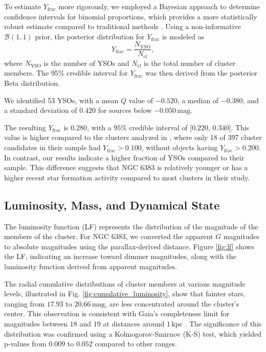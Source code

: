 \documentclass{aa}
\begin{document}
To estimate $ Y_{\text{frac}} $ more rigorously, we employed a Bayesian approach to determine confidence intervals for binomial proportions, which provides a more statistically robust estimate compared to traditional methods \citep{2011PASA...28..128C}. Using a non-informative $\mathcal{B}(1, 1)$ prior, the posterior distribution for $ Y_{\text{frac}} $ is modeled as
\begin{equation}
	Y_{\text{frac}} = \frac{N_{\text{YSO}}}{N_{\text{cl}}},
\end{equation}
where $ N_{\text{YSO}} $ is the number of YSOs and $ N_{\text{cl}} $ is the total number of cluster members. The $95\%$ credible interval for $ Y_{\text{frac}} $ was then derived from the posterior Beta distribution.

We identified 53 YSOs, with a mean $ Q $ value of $-0.520$, a median of $-0.380$, and a standard deviation of $0.420$ for sources below $-0.050\,\mathrm{mag}$.

The resulting $ Y_{\text{frac}} $ is $0.280$, with a $95\%$ credible interval of [$0.220$, $0.340$]. This value is higher compared to the clusters analyzed in \citet{2013MNRAS.436.1465B}, where only 18 of 397 cluster candidates in their sample had $ Y_{\text{frac}} > 0.100 $, without objects having $ Y_{\text{frac}} > 0.200 $. In contrast, our results indicate a higher fraction of YSOs compared to their sample. This difference suggests that NGC 6383 is relatively younger or has a higher recent star formation activity compared to most clusters in their study.

\subsection{Luminosity, Mass, and Dynamical State}\label{subsec:lum_mass_dyn}

The luminosity function (LF) represents the distribution of the magnitude of the members of the cluster. For NGC 6383, we converted the apparent $G$ magnitudes to absolute magnitudes using the parallax-derived distance. Figure \ref{fig:lf} shows the LF, indicating an increase toward dimmer magnitudes, along with the luminosity function derived from apparent magnitudes.

The radial cumulative distributions of cluster members at various magnitude levels, illustrated in Fig. \ref{fig:cumulative_luminosity}, show that fainter stars, ranging from $17.93$ to $20.66\,\mathrm{mag}$, are less concentrated around the cluster's center. This observation is consistent with Gaia's completeness limit for magnitudes between $18$ and $19$ at distances around $1\,\mathrm{kpc}$ \citep{2020MNRAS.497.4246B,2023AA...677A..37C}. The significance of this distribution was confirmed using a Kolmogorov-Smirnov (K-S) test, which yielded p-values from $0.009$ to $0.052$ compared to other ranges.
\end{document}
